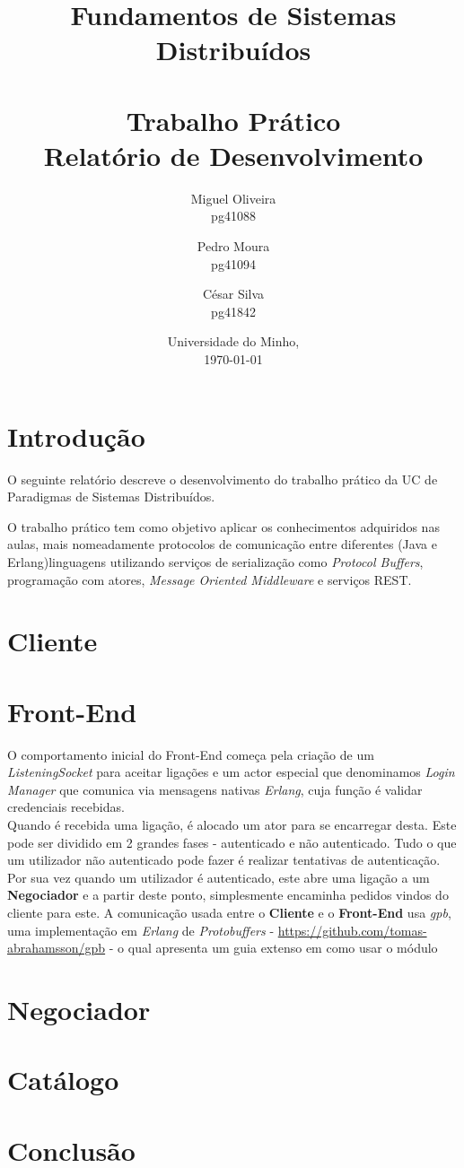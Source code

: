 \documentclass[12pt, a4paper]{report}
\begin{document}
\title{
    Fundamentos de Sistemas Distribuídos\\
    \textbf{\\Trabalho Prático}
    \large{\\Relatório de Desenvolvimento}
}

\author{
    Miguel Oliveira\\ pg41088
    \and Pedro Moura\\ pg41094
    \and César Silva\\ pg41842
}
\date{Universidade do Minho,\\\today}

\maketitle

\tableofcontents

\chapter{Introdução}
O seguinte relatório descreve o desenvolvimento do trabalho prático da UC de Paradigmas de Sistemas Distribuídos.

O trabalho prático tem como objetivo aplicar os conhecimentos adquiridos nas aulas, mais nomeadamente protocolos de comunicação entre diferentes  (Java e Erlang)linguagens utilizando serviços de serialização como \textit{Protocol Buffers}, programação com atores, \textit{Message Oriented Middleware} e serviços REST.


\chapter{Cliente}

\chapter{Front-End}

O comportamento inicial do Front-End começa pela criação de um
\textit{ListeningSocket} para aceitar ligações e um actor especial que 
denominamos \textit{Login Manager} que comunica via mensagens nativas
\textit{Erlang}, cuja função é validar credenciais recebidas. \\
Quando é recebida uma ligação, é alocado um ator para se encarregar desta.
Este pode ser dividido em 2 grandes fases - autenticado e não autenticado.
Tudo o que um utilizador não autenticado pode fazer é realizar tentativas de
autenticação. Por sua vez quando um utilizador é autenticado, este abre uma
ligação a um \textbf{Negociador} e a partir deste ponto, simplesmente encaminha
pedidos vindos do cliente para este. A comunicação usada entre
o \textbf{Cliente} e o \textbf{Front-End} usa \textit{gpb}, uma implementação em
\textit{Erlang} de \textit{Protobuffers}
- \url{https://github.com/tomas-abrahamsson/gpb} - o qual apresenta um guia
extenso em como usar o módulo

 
\chapter{Negociador}

\chapter{Catálogo}

\chapter{Conclusão}
\end{document}
